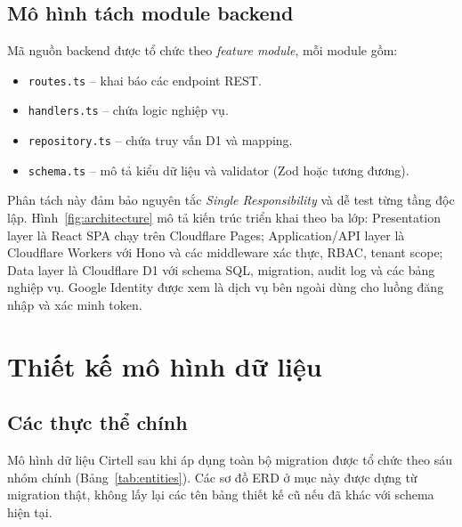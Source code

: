 \subsection{Mô hình tách module backend}
Mã nguồn backend được tổ chức theo \emph{feature module}, mỗi module gồm:

\begin{itemize}[leftmargin=1.2cm]
    \item \texttt{routes.ts} -- khai báo các endpoint REST.
    \item \texttt{handlers.ts} -- chứa logic nghiệp vụ.
    \item \texttt{repository.ts} -- chứa truy vấn D1 và mapping.
    \item \texttt{schema.ts} -- mô tả kiểu dữ liệu và validator (Zod hoặc tương đương).
\end{itemize}

Phân tách này đảm bảo nguyên tắc \emph{Single Responsibility} và dễ test từng tầng độc lập. Hình~\ref{fig:architecture} mô tả kiến trúc triển khai theo ba lớp: Presentation layer là React SPA chạy trên Cloudflare Pages; Application/API layer là Cloudflare Workers với Hono và các middleware xác thực, RBAC, tenant scope; Data layer là Cloudflare D1 với schema SQL, migration, audit log và các bảng nghiệp vụ. Google Identity được xem là dịch vụ bên ngoài dùng cho luồng đăng nhập và xác minh token.


\section{Thiết kế mô hình dữ liệu}
\label{sec:erd}

\subsection{Các thực thể chính}
Mô hình dữ liệu Cirtell sau khi áp dụng toàn bộ migration được tổ chức theo sáu nhóm chính (Bảng~\ref{tab:entities}). Các sơ đồ ERD ở mục này được dựng từ migration thật, không lấy lại các tên bảng thiết kế cũ nếu đã khác với schema hiện tại.

